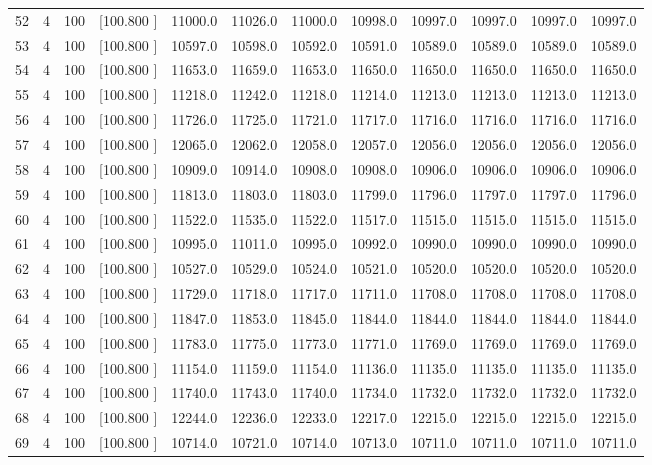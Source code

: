 \documentclass[12pt,a4paper]{article}
\begin{document}
\begin{center}
{\begin{tabular}{r r r r r r r r r r r r}
  52&  4&100&[100.800   ]& 11000.0& 11026.0& 11000.0& 10998.0& 10997.0& 10997.0& 10997.0& 10997.0\\[-0.02in]
  53&  4&100&[100.800   ]& 10597.0& 10598.0& 10592.0& 10591.0& 10589.0& 10589.0& 10589.0& 10589.0\\[-0.02in]
  54&  4&100&[100.800   ]& 11653.0& 11659.0& 11653.0& 11650.0& 11650.0& 11650.0& 11650.0& 11650.0\\[-0.02in]
  55&  4&100&[100.800   ]& 11218.0& 11242.0& 11218.0& 11214.0& 11213.0& 11213.0& 11213.0& 11213.0\\[-0.02in]
  56&  4&100&[100.800   ]& 11726.0& 11725.0& 11721.0& 11717.0& 11716.0& 11716.0& 11716.0& 11716.0\\[-0.02in]
  57&  4&100&[100.800   ]& 12065.0& 12062.0& 12058.0& 12057.0& 12056.0& 12056.0& 12056.0& 12056.0\\[-0.02in]
  58&  4&100&[100.800   ]& 10909.0& 10914.0& 10908.0& 10908.0& 10906.0& 10906.0& 10906.0& 10906.0\\[-0.02in]
  59&  4&100&[100.800   ]& 11813.0& 11803.0& 11803.0& 11799.0& 11796.0& 11797.0& 11797.0& 11796.0\\[-0.02in]
  60&  4&100&[100.800   ]& 11522.0& 11535.0& 11522.0& 11517.0& 11515.0& 11515.0& 11515.0& 11515.0\\[-0.02in]
  61&  4&100&[100.800   ]& 10995.0& 11011.0& 10995.0& 10992.0& 10990.0& 10990.0& 10990.0& 10990.0\\[-0.02in]
  62&  4&100&[100.800   ]& 10527.0& 10529.0& 10524.0& 10521.0& 10520.0& 10520.0& 10520.0& 10520.0\\[-0.02in]
  63&  4&100&[100.800   ]& 11729.0& 11718.0& 11717.0& 11711.0& 11708.0& 11708.0& 11708.0& 11708.0\\[-0.02in]
  64&  4&100&[100.800   ]& 11847.0& 11853.0& 11845.0& 11844.0& 11844.0& 11844.0& 11844.0& 11844.0\\[-0.02in]
  65&  4&100&[100.800   ]& 11783.0& 11775.0& 11773.0& 11771.0& 11769.0& 11769.0& 11769.0& 11769.0\\[-0.02in]
  66&  4&100&[100.800   ]& 11154.0& 11159.0& 11154.0& 11136.0& 11135.0& 11135.0& 11135.0& 11135.0\\[-0.02in]
  67&  4&100&[100.800   ]& 11740.0& 11743.0& 11740.0& 11734.0& 11732.0& 11732.0& 11732.0& 11732.0\\[-0.02in]
  68&  4&100&[100.800   ]& 12244.0& 12236.0& 12233.0& 12217.0& 12215.0& 12215.0& 12215.0& 12215.0\\[-0.02in]
  69&  4&100&[100.800   ]& 10714.0& 10721.0& 10714.0& 10713.0& 10711.0& 10711.0& 10711.0& 10711.0\\[-0.02in]

\end{tabular}}
\end{center}
\end{document}
